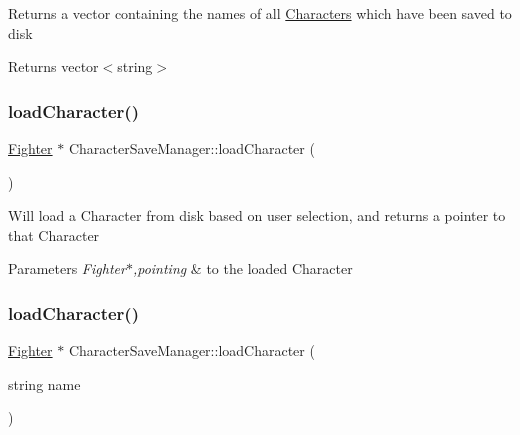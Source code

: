 Returns a vector containing the names of all \hyperlink{class_characters}{Characters} which have been saved to disk \begin{DoxyReturn}{Returns}
vector$<$string$>$ 
\end{DoxyReturn}
\hypertarget{class_character_save_manager_a44105e8553b29cd7e37f3eec6f1a7ce7}{}\label{class_character_save_manager_a44105e8553b29cd7e37f3eec6f1a7ce7} 
\subsubsection{\texorpdfstring{load\+Character()}{loadCharacter()}\hspace{0.1cm}{\footnotesize\ttfamily [1/2]}}
{\footnotesize\ttfamily \hyperlink{class_fighter}{Fighter} $\ast$ Character\+Save\+Manager\+::load\+Character (\begin{DoxyParamCaption}{ }\end{DoxyParamCaption})\hspace{0.3cm}{\ttfamily [static]}}

Will load a Character from disk based on user selection, and returns a pointer to that Character 
\begin{DoxyParams}{Parameters}
{\em Fighter$\ast$,pointing} & to the loaded Character \\
\hline
\end{DoxyParams}
\hypertarget{class_character_save_manager_a8ee1fcce6a61b16b41dfa675264d5bdf}{}\label{class_character_save_manager_a8ee1fcce6a61b16b41dfa675264d5bdf} 
\subsubsection{\texorpdfstring{load\+Character()}{loadCharacter()}\hspace{0.1cm}{\footnotesize\ttfamily [2/2]}}
{\footnotesize\ttfamily \hyperlink{class_fighter}{Fighter} $\ast$ Character\+Save\+Manager\+::load\+Character (\begin{DoxyParamCaption}\item[{string}]{name }\end{DoxyParamCaption})\hspace{0.3cm}{\ttfamily [static]}}

